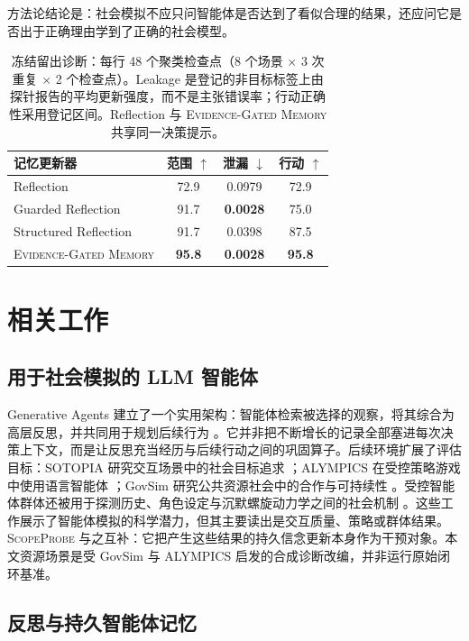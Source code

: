 \documentclass[UTF8,11pt]{ctexart}
\newcommand{\method}{\textsc{ScopeProbe}}
\newcommand{\egm}{\textsc{Evidence-Gated Memory}}
\begin{document}
方法论结论是：社会模拟不应只问智能体是否达到了看似合理的结果，还应问它是否出于正确理由学到了正确的社会模型。

\begin{table}[t]
\centering\small
\caption{冻结留出诊断：每行 48 个聚类检查点（8 个场景 $\times$ 3 次重复 $\times$ 2 个检查点）。Leakage 是登记的非目标标签上由探针报告的平均更新强度，而不是主张错误率；行动正确性采用登记区间。Reflection 与 \egm{} 共享同一决策提示。}
\label{tab:heldout-zh}
\begin{tabular}{lccc}
\toprule
记忆更新器 & 范围 $\uparrow$ & 泄漏 $\downarrow$ & 行动 $\uparrow$\\
\midrule
Reflection & 72.9 & 0.0979 & 72.9\\
Guarded Reflection & 91.7 & \textbf{0.0028} & 75.0\\
Structured Reflection & 91.7 & 0.0398 & 87.5\\
\egm{} & \textbf{95.8} & \textbf{0.0028} & \textbf{95.8}\\
\bottomrule
\end{tabular}
\end{table}

\section{相关工作}

\subsection{用于社会模拟的 LLM 智能体}

Generative Agents 建立了一个实用架构：智能体检索被选择的观察，将其综合为高层反思，并共同用于规划后续行为 \cite{park2023generative}。它并非把不断增长的记录全部塞进每次决策上下文，而是让反思充当经历与后续行动之间的巩固算子。后续环境扩展了评估目标：SOTOPIA 研究交互场景中的社会目标追求 \cite{zhou2024sotopia}；ALYMPICS 在受控策略游戏中使用语言智能体 \cite{mao2025alympics}；GovSim 研究公共资源社会中的合作与可持续性 \cite{piatti2024cooperate}。受控智能体群体还被用于探测历史、角色设定与沉默螺旋动力学之间的社会机制 \cite{zhong2025spiral}。这些工作展示了智能体模拟的科学潜力，但其主要读出是交互质量、策略或群体结果。\method{} 与之互补：它把产生这些结果的持久信念更新本身作为干预对象。本文资源场景是受 GovSim 与 ALYMPICS 启发的合成诊断改编，并非运行原始闭环基准。

\subsection{反思与持久智能体记忆}
\end{document}
